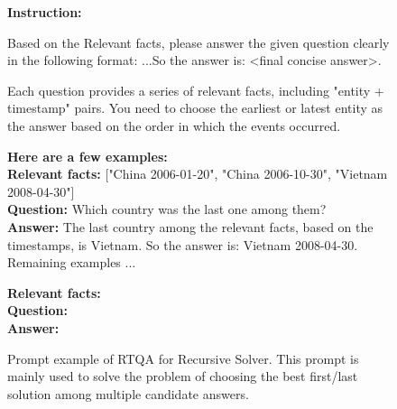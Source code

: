 \documentclass[11pt]{article}
\begin{document}
%
\begin{figure}[!h]
\begin{tcolorbox}[
    colback=black!10, 
    colframe=black!70, 
    boxrule=1pt, 
    arc=5mm, 
    boxsep=2mm, 
    left=5mm, 
    right=5mm, 
    top=5mm, 
    bottom=4mm,
    width=\textwidth, %
    nobeforeafter, %
    colupper=black %
]
{\small\sffamily %
\textbf{Instruction:} 

Based on the Relevant facts, please answer the given question clearly in the following format: ...So the answer is: <final concise answer>.

Each question provides a series of relevant facts, including "entity + timestamp" pairs. You need to choose the earliest or latest entity as the answer based on the order in which the events occurred. 

\vspace{0.5em}
\textbf{Here are a few examples:}\\[1em]
\textbf{Relevant facts: } ["China 2006-01-20", "China 2006-10-30", "Vietnam 2008-04-30"]\\
\textbf{Question:} Which country was the last one among them?\\
\textbf{Answer:} The last country among the relevant facts, based on the timestamps, is Vietnam. So the answer is: Vietnam 2008-04-30.\\[0.5em]

Remaining examples ...
\vspace{0.5em}

\textbf{Relevant facts:}  \\
\textbf{Question:} \\
\textbf{Answer:}
} %
\end{tcolorbox}
\caption{Prompt example of RTQA for Recursive Solver. This prompt is mainly used to solve the problem of choosing the best first/last solution among multiple candidate answers.}
\label{fig:prompt solver relevant}
\end{figure}
\end{document}
